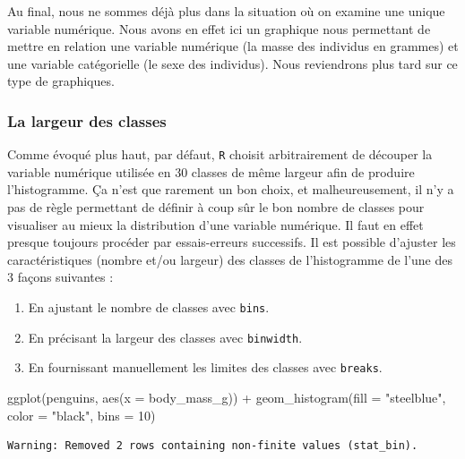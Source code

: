 \documentclass[
  letterpaper,
  DIV=11,
  numbers=noendperiod]{scrreprt}
\newenvironment{Shaded}{\begin{snugshade}}{\end{snugshade}}
\newcommand{\AttributeTok}[1]{\textcolor[rgb]{0.40,0.45,0.13}{#1}}
\newcommand{\DecValTok}[1]{\textcolor[rgb]{0.68,0.00,0.00}{#1}}
\newcommand{\FunctionTok}[1]{\textcolor[rgb]{0.28,0.35,0.67}{#1}}
\newcommand{\NormalTok}[1]{\textcolor[rgb]{0.00,0.23,0.31}{#1}}
\newcommand{\SpecialCharTok}[1]{\textcolor[rgb]{0.37,0.37,0.37}{#1}}
\newcommand{\StringTok}[1]{\textcolor[rgb]{0.13,0.47,0.30}{#1}}
\providecommand{\tightlist}{%
  \setlength{\itemsep}{0pt}\setlength{\parskip}{0pt}}\usepackage{longtable,booktabs,array}
\begin{document}
Au final, nous ne sommes déjà plus dans la situation où on examine une
unique variable numérique. Nous avons en effet ici un graphique nous
permettant de mettre en relation une variable numérique (la masse des
individus en grammes) et une variable catégorielle (le sexe des
individus). Nous reviendrons plus tard sur ce type de graphiques.

\hypertarget{la-largeur-des-classes}{%
\subsubsection{La largeur des classes}\label{la-largeur-des-classes}}

Comme évoqué plus haut, par défaut, \texttt{R} choisit arbitrairement de
découper la variable numérique utilisée en 30 classes de même largeur
afin de produire l'histogramme. Ça n'est que rarement un bon choix, et
malheureusement, il n'y a pas de règle permettant de définir à coup sûr
le bon nombre de classes pour visualiser au mieux la distribution d'une
variable numérique. Il faut en effet presque toujours procéder par
essais-erreurs successifs. Il est possible d'ajuster les
caractéristiques (nombre et/ou largeur) des classes de l'histogramme de
l'une des 3 façons suivantes :

\begin{enumerate}
\def\labelenumi{\arabic{enumi}.}
\tightlist
\item
  En ajustant le nombre de classes avec \texttt{bins}.
\item
  En précisant la largeur des classes avec \texttt{binwidth}.
\item
  En fournissant manuellement les limites des classes avec
  \texttt{breaks}.
\end{enumerate}

\begin{Shaded}
\begin{Highlighting}[]
\FunctionTok{ggplot}\NormalTok{(penguins, }\FunctionTok{aes}\NormalTok{(}\AttributeTok{x =}\NormalTok{ body\_mass\_g)) }\SpecialCharTok{+}
  \FunctionTok{geom\_histogram}\NormalTok{(}\AttributeTok{fill =} \StringTok{"steelblue"}\NormalTok{, }\AttributeTok{color =} \StringTok{"black"}\NormalTok{,}
                 \AttributeTok{bins =} \DecValTok{10}\NormalTok{)}
\end{Highlighting}
\end{Shaded}

\begin{verbatim}
Warning: Removed 2 rows containing non-finite values (stat_bin).
\end{verbatim}
\end{document}
